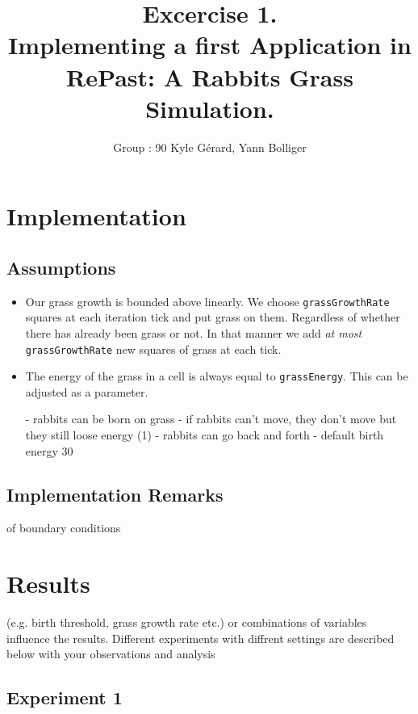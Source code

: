 \documentclass[11pt]{article}
\title{\bf Excercise 1.\\ Implementing a first Application in RePast: A Rabbits Grass Simulation.}
\author{Group \textnumero: 90  Kyle Gérard, Yann Bolliger}
\begin{document}
\maketitle

\section{Implementation}

\subsection{Assumptions}
\begin{itemize}

\item 
Our grass growth is bounded above linearly. We choose \texttt{grassGrowthRate} 
squares at each iteration tick and put grass on them. Regardless of whether 
there has already been grass or not. In that manner we add \textit{at most} \texttt{grassGrowthRate} 
new squares of grass at each tick.

\item 
The energy of the grass in a cell is always equal to \texttt{grassEnergy}.
This can be adjusted as a parameter.

 
 - rabbits can be born on grass
 - if rabbits can't move, they don't move but they still loose energy (1)
 - rabbits can go back and forth
 - default birth energy 30
 
\end{itemize}



\subsection{Implementation Remarks}
of boundary conditions %

\section{Results}
(e.g. birth threshold, grass growth rate etc.) or combinations of variables
influence the results. Different experiments with diffrent settings are
described below with your observations and analysis

\subsection{Experiment 1}
\end{document}
